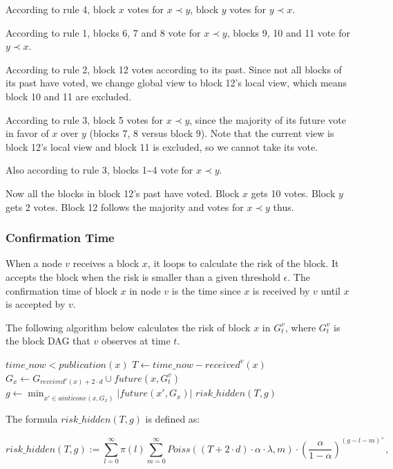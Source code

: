 \documentclass[a4paper,11pt]{article}
\begin{document}
According to rule 4, block $x$ votes for $x \prec y$, block $y$ votes for $y
\prec x$.

According to rule 1, blocks 6, 7 and 8 vote for $x \prec y$, blocks 9, 10 and 11
vote for $y \prec x$.

According to rule 2, block 12 votes according to its past. Since not all blocks
of its past have voted, we change global view to block 12's local view, which
means block 10 and 11 are excluded.

According to rule 3, block 5 votes for $x \prec y$, since the majority of its
future vote in favor of $x$ over $y$ (blocks 7, 8 versus block 9). Note that the
current view is block 12's local view and block 11 is excluded, so we cannot
take its vote.

Also according to rule 3, blocks 1\textasciitilde4 vote for $x \prec y$.

Now all the blocks in block 12's past have voted. Block $x$ gets 10 votes. Block
$y$ gets 2 votes. Block 12 follows the majority and votes for $x \prec y$ thus.


\subsubsection*{Confirmation Time}

When a node $v$ receives a block $x$, it loops to calculate the  risk of
the block. It accepts the block when the risk is smaller than a given threshold
$\epsilon$. The confirmation time of block $x$ in node $v$ is the time
since $x$ is received by $v$ until $x$ is accepted by $v$.

The following algorithm below calculates the  risk of block $x$ in
$G_t^v$, where $G_t^v$ is the block DAG that $v$ observes at time $t$.

\begin{codebox}
\li \If $time\_now < publication(x)$
\li   \Then
      \End
\li $T \gets time\_now - received^v(x)$
\li $G_x \gets G_{received^v(x) + 2 \cdot d} \cup future(x, G_t^v)$
\li $g \gets \min_{x' \in \overline{ainticone}(x,G_x)} |future(x',G_x)|$
\li \Return $risk\_hidden(T,g)$
\end{codebox}

The formula $risk\_hidden(T,g)$ is defined as:

$$
risk\_hidden(T,g) := \sum_{l=0}^{\infty} \pi(l) \sum_{m=0}^{\infty} Poiss((T + 2
\cdot d) \cdot \alpha \cdot \lambda, m) \cdot \left(\frac{\alpha}{1 -
\alpha}\right)^{(g - l - m)^+},
$$
\end{document}
